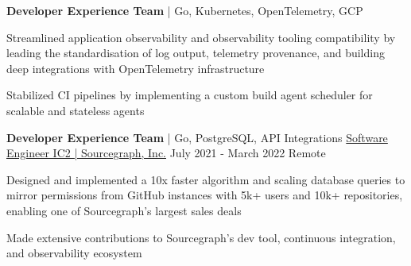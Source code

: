 \begin{cventries}
  \cventry
    {\textbf{Developer Experience Team} | Go, Kubernetes, OpenTelemetry, GCP} %
    {}
    {}
    {} %
    {
        \begin{cvitems}
          \item {Streamlined application observability and observability tooling compatibility by leading the standardisation of log output, telemetry provenance, and building deep integrations with OpenTelemetry infrastructure}
          \item {Stabilized CI pipelines by implementing a custom build agent scheduler for scalable and stateless agents}
        \end{cvitems}
    }

  \cventry
    {\textbf{Developer Experience Team} | Go, PostgreSQL, API Integrations}
    {\href{https://bobheadxi.dev/experience/sourcegraph}{Software Engineer IC2 | Sourcegraph, Inc.}} %
    {July 2021 - March 2022} %
    {Remote} %
    {
        \begin{cvitems}
          \item {Designed and implemented a 10x faster algorithm and scaling database queries to mirror permissions from GitHub instances with 5k+ users and 10k+ repositories, enabling one of Sourcegraph's largest sales deals}
          \item {Made extensive contributions to Sourcegraph's dev tool, continuous integration, and observability ecosystem}
        \end{cvitems}
    }


\end{cventries}

